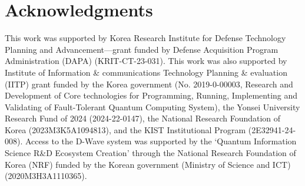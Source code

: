 \documentclass[showpacs,twocolumn,superscriptaddress]{revtex4-2}
\begin{document}
\section*{Acknowledgments}
This work was supported by Korea Research Institute for Defense Technology Planning and Advancement---grant funded by Defense Acquisition Program Administration (DAPA) (KRIT-CT-23-031). This work was also supported by Institute of Information \& communications Technology Planning \& evaluation (IITP) grant funded by the Korea government (No. 2019-0-00003, Research and Development of Core technologies for Programming, Running, Implementing and Validating of Fault-Tolerant Quantum Computing System), the Yonsei University Research Fund of 2024 (2024-22-0147), the National Research Foundation of Korea (2023M3K5A1094813), and the KIST Institutional Program (2E32941-24-008). Access to the D-Wave system was supported by the `Quantum Information Science R\&D Ecosystem Creation' through the National Research Foundation of Korea (NRF) funded by the Korean government (Ministry of Science and ICT) (2020M3H3A1110365).
%
%
\end{document}
